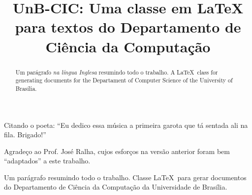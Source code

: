 \documentclass[mpca]{unb-cic}
\title{UnB-CIC: Uma classe em LaTeX para textos do Departamento de Ciência da Computação}%
\begin{document}
  \maketitle

  \begin{dedicatoria}
Citando o poeta: ``Eu dedico essa música a primeira garota que tá sentada ali na fila. Brigado!''
  \end{dedicatoria}

  \begin{agradecimentos}
Agradeço ao Prof. José Ralha, cujos esforços na versão anterior foram bem ``adaptados'' a este trabalho.
  \end{agradecimentos}


  \begin{resumo}
  Um parágrafo resumindo todo o trabalho. Classe \LaTeX\ para gerar documentos do Departamento de Ciência da Computação da Universidade de Brasília.
  \end{resumo}

  \begin{abstract}
  Um parágrafo \emph{na língua Inglesa} resumindo todo o trabalho. A \LaTeX\ class for generating documents for the Departament of Computer Science of the University of Brasília.
  \end{abstract}
  \tableofcontents
  \listoffigures
  \listoftables

\renewcommand{\appendixname}{Anexo}


  \textual
  
  
  

  \postextual
  
  

\appendix
  
\end{document}
